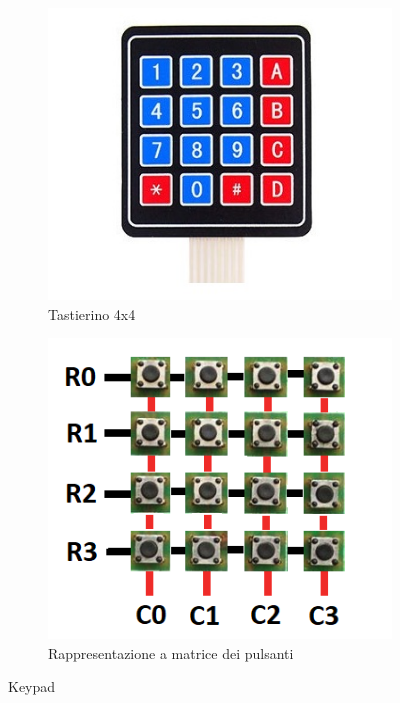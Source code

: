 \documentclass[12pt]{report}
\begin{document}
\begin{figure}[H]
	\centering
	\begin{subfigure}{.5\textwidth}
		\centering
		\includegraphics[width=0.6\linewidth]{./img/keypad.jpg}
		\caption{Tastierino 4x4}
		\label{fig:keypad}
	\end{subfigure}%
	\begin{subfigure}{.5\textwidth}
		\centering
		\includegraphics[width=0.58\linewidth]{./img/keypad_matrix.png}
		\caption{Rappresentazione a matrice dei pulsanti}
		\label{fig:keypad_matrix}
	\end{subfigure}
	\caption{Keypad}
	\label{fig:keypad_both}
\end{figure}
\end{document}
